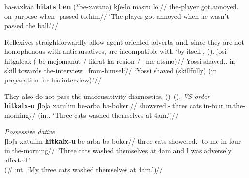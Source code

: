 	\a \begingl
	\gla ha-saxkan \textbf{hitats ben} (*be-xavana) kʃe-lo masru lo.//
	\glb the-player got.annoyed. \phantom{(*}on-purpose when- passed to.him//
	\glft `The player got annoyed when he wasn't passed the ball.'//
	\endgl
\xe
%
%
%

Reflexives straightforwardly allow agent-oriented adverbs and, since they are not homophonous with anticausatives, are incompatible with `by itself', (\nextx).
\ex
	\begingl
		\gla josi hitgaleax ({\cmark} be-mejomanut / {\cmark} likrat ha-reaion / {\xmark}~me-a{ts}mo)//
		\glb Yossi shaved.. {} in-skill {} {} towards the-interview {} {\phantom{\xmark}}~from-himself//
		\glft `Yossi shaved (skillfully) (in preparation for his interview).'//
	\endgl
\xe

They also do not pass the unaccusativity diagnostics, (\nextx)--(\anextx).
\ex \textit{VS order}\\
	\begingl
	\gla \ljudge{\#}\textbf{hitkalx-u} ʃloʃa xatulim be-arba ba-boker.//
	\glb showered.- three cats in-four in.the-morning//
	\glft (int. `Three cats washed themselves at 4am.')//
	\endgl
\xe

\ex \textit{Possessive dative}\\
	\begingl 
	\gla \ljudge{\#}ʃloʃa xatulim \textbf{hitkalx-u}  be-arba ba-boker//
	\glb three cats showered.- to-me in-four in.the-morning//
	\glft `Three cats washed themselves at 4am and I was adversely affected.'\\
		(\# int. `My three cats washed themselves at 4am.')//
	\endgl
\xe

